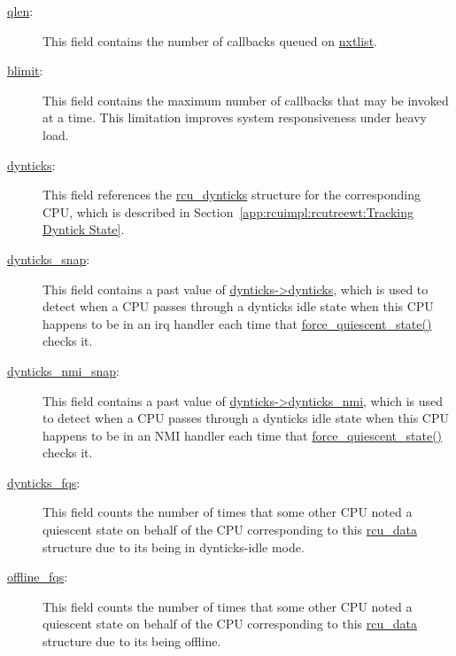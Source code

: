 \begin{description}
\item[\url{qlen}:]
	This field contains the number of callbacks queued on
	\url{nxtlist}.
\item[\url{blimit}:]
	This field contains the maximum number of callbacks that may
	be invoked at a time.
	This limitation improves system responsiveness under heavy load.
\item[\url{dynticks}:]
	This field references the \url{rcu_dynticks} structure for
	the corresponding CPU, which is described in
	Section~\ref{app:rcuimpl:rcutreewt:Tracking Dyntick State}.
\item[\url{dynticks_snap}:]
	This field contains a past value of \url{dynticks->dynticks},
	which is used to detect when a CPU passes through a dynticks
	idle state when this CPU happens to be in an irq
	handler each time that \url{force_quiescent_state()} checks it.
\item[\url{dynticks_nmi_snap}:]
	This field contains a past value of \url{dynticks->dynticks_nmi},
	which is used to detect when a CPU passes through a dynticks
	idle state when this CPU happens to be in an NMI
	handler each time that \url{force_quiescent_state()} checks it.
\item[\url{dynticks_fqs}:]
	This field counts the number of times that some other CPU noted
	a quiescent state on behalf of
	the CPU corresponding to this \url{rcu_data} structure due to
	its being in dynticks-idle mode.
\item[\url{offline_fqs}:]
	This field counts the number of times that some other CPU noted
	a quiescent state on behalf of
	the CPU corresponding to this \url{rcu_data} structure due to
	its being offline.

 \QuickQuizEnd


\end{description}
